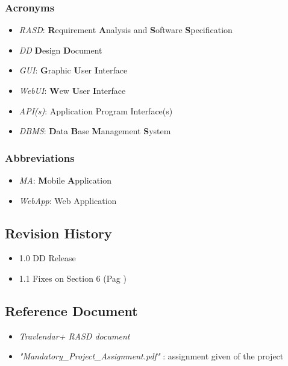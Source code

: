 \subsubsection{Acronyms}
\begin{itemize}
	\item \textsl{RASD}: \textbf{R}equirement \textbf{A}nalysis and \textbf{S}oftware \textbf{S}pecification
	\item \textsl{DD} \textbf{D}esign \textbf{D}ocument
	\item \textsl{GUI}: \textbf{G}raphic \textbf{U}ser \textbf{I}nterface
	\item \textsl{WebUI}: \textbf{W}ew \textbf{U}ser \textbf{I}nterface
	\item \textsl{API(s)}: Application Program Interface(s)
	\item \textsl{DBMS}: \textbf{D}ata \textbf{B}ase \textbf{M}anagement \textbf{S}ystem
\end{itemize}
\subsubsection{Abbreviations}
\begin{itemize}
	\item \textsl{MA}: \textbf{M}obile \textbf{A}pplication
	\item \textsl{WebApp}: Web Application
	
\end{itemize}

\subsection{Revision History}

\begin{itemize}
	\item 1.0 DD Release
	\item 1.1 Fixes on Section 6 (Pag \pageref{sect:implementation})
\end{itemize}

\subsection{Reference Document}

\begin{itemize}
	\item \textsl{Travlendar+ RASD document}
	\item \textsl{"Mandatory\_Project\_Assignment.pdf" }: assignment given of the project
	
\end{itemize}

